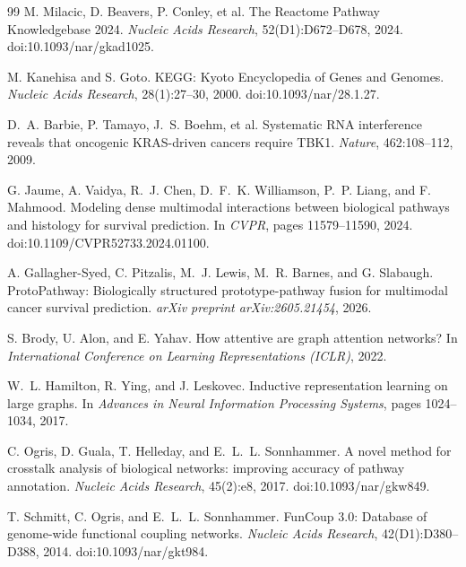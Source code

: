 \documentclass[11pt]{article}
\begin{document}
\begin{thebibliography}{99}
M. Milacic, D. Beavers, P. Conley, et al.
\newblock The Reactome Pathway Knowledgebase 2024.
\newblock \emph{Nucleic Acids Research}, 52(D1):D672--D678, 2024.
\newblock doi:10.1093/nar/gkad1025.

M. Kanehisa and S. Goto.
\newblock KEGG: Kyoto Encyclopedia of Genes and Genomes.
\newblock \emph{Nucleic Acids Research}, 28(1):27--30, 2000.
\newblock doi:10.1093/nar/28.1.27.

D.~A. Barbie, P. Tamayo, J.~S. Boehm, et al.
\newblock Systematic RNA interference reveals that oncogenic KRAS-driven
cancers require TBK1.
\newblock \emph{Nature}, 462:108--112, 2009.

G. Jaume, A. Vaidya, R.~J. Chen, D.~F.~K. Williamson, P.~P. Liang, and
F. Mahmood.
\newblock Modeling dense multimodal interactions between biological pathways
and histology for survival prediction.
\newblock In \emph{CVPR}, pages 11579--11590, 2024.
\newblock doi:10.1109/CVPR52733.2024.01100.

A. Gallagher-Syed, C. Pitzalis, M.~J. Lewis, M.~R. Barnes, and G. Slabaugh.
\newblock ProtoPathway: Biologically structured prototype-pathway fusion for
multimodal cancer survival prediction.
\newblock \emph{arXiv preprint arXiv:2605.21454}, 2026.

S. Brody, U. Alon, and E. Yahav.
\newblock How attentive are graph attention networks?
\newblock In \emph{International Conference on Learning Representations
(ICLR)}, 2022.

W.~L. Hamilton, R. Ying, and J. Leskovec.
\newblock Inductive representation learning on large graphs.
\newblock In \emph{Advances in Neural Information Processing Systems},
pages 1024--1034, 2017.

C. Ogris, D. Guala, T. Helleday, and E.~L.~L. Sonnhammer.
\newblock A novel method for crosstalk analysis of biological networks:
improving accuracy of pathway annotation.
\newblock \emph{Nucleic Acids Research}, 45(2):e8, 2017.
\newblock doi:10.1093/nar/gkw849.

T. Schmitt, C. Ogris, and E.~L.~L. Sonnhammer.
\newblock FunCoup 3.0: Database of genome-wide functional coupling networks.
\newblock \emph{Nucleic Acids Research}, 42(D1):D380--D388, 2014.
\newblock doi:10.1093/nar/gkt984.


\end{thebibliography}
\end{document}
